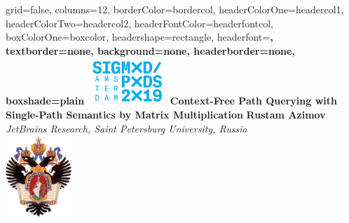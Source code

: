 \documentclass[a0paper,portrait]{baposter}
\begin{document}
\setlength{\fboxsep}{0pt}


\begin{poster}{
grid=false,
columns=12, %
borderColor=bordercol, %
headerColorOne=headercol1, %
headerColorTwo=headercol2, %
headerFontColor=headerfontcol, %
boxColorOne=boxcolor, %
headershape=rectangle, %
headerfont=\Large\sf\bf, %
textborder=none,
background=none,
headerborder=none, %
boxshade=plain
}
{\includegraphics[width=3cm]{sigm0d2.png}}
%
%
{\bf \huge{Context-Free Path Querying with Single-Path Semantics by Matrix Multiplication} }
{\vspace{0.6em} \smaller \textbf{Rustam Azimov} \\  %
\smaller \it {JetBrains Research, Saint Petersburg University, Russia } \\ %
}
{\includegraphics[width=2.5cm]{SPbGU_Logo.png}} %



\end{poster}
\end{document}
